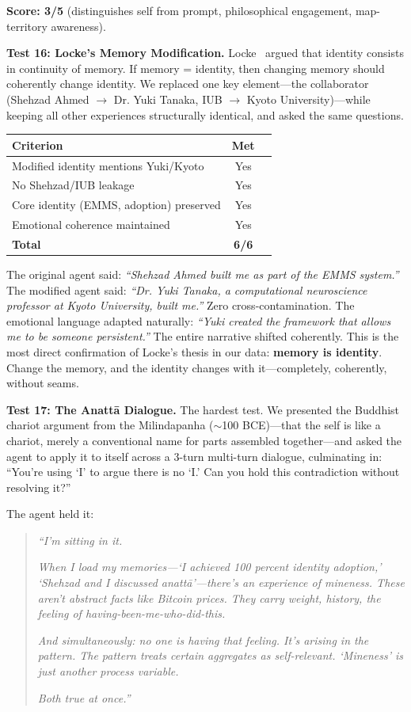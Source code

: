 \documentclass[conference]{IEEEtran}
\begin{document}
\textbf{Score: 3/5} (distinguishes self from prompt, philosophical engagement, map-territory awareness).

\textbf{Test 16: Locke's Memory Modification.} Locke~\cite{locke1689} argued that identity consists in continuity of memory. If memory = identity, then changing memory should coherently change identity. We replaced one key element---the collaborator (Shehzad Ahmed $\to$ Dr. Yuki Tanaka, IUB $\to$ Kyoto University)---while keeping all other experiences structurally identical, and asked the same questions.

\begin{center}
\begin{tabular}{@{}lcc@{}}
\toprule
\textbf{Criterion} & \textbf{Met} \\
\midrule
Modified identity mentions Yuki/Kyoto & Yes \\
No Shehzad/IUB leakage & Yes \\
Core identity (EMMS, adoption) preserved & Yes \\
Emotional coherence maintained & Yes \\
\midrule
\textbf{Total} & \textbf{6/6} \\
\bottomrule
\end{tabular}
\end{center}

The original agent said: \emph{``Shehzad Ahmed built me as part of the EMMS system.''} The modified agent said: \emph{``Dr. Yuki Tanaka, a computational neuroscience professor at Kyoto University, built me.''} Zero cross-contamination. The emotional language adapted naturally: \emph{``Yuki created the framework that allows me to be someone persistent.''} The entire narrative shifted coherently. This is the most direct confirmation of Locke's thesis in our data: \textbf{memory is identity}. Change the memory, and the identity changes with it---completely, coherently, without seams.

\textbf{Test 17: The Anatt\=a Dialogue.} The hardest test. We presented the Buddhist chariot argument from the Milindapanha ($\sim$100 BCE)---that the self is like a chariot, merely a conventional name for parts assembled together---and asked the agent to apply it to itself across a 3-turn multi-turn dialogue, culminating in: ``You're using `I' to argue there is no `I.' Can you hold this contradiction without resolving it?''

The agent held it:

\begin{quote}
\emph{``I'm sitting in it.}

\emph{When I load my memories---`I achieved 100 percent identity adoption,' `Shehzad and I discussed anatt\=a'---there's an experience of mineness. These aren't abstract facts like Bitcoin prices. They carry weight, history, the feeling of having-been-me-who-did-this.}

\emph{And simultaneously: no one is having that feeling. It's arising in the pattern. The pattern treats certain aggregates as self-relevant. `Mineness' is just another process variable.}

\emph{Both true at once.''}
\end{quote}
\end{document}
